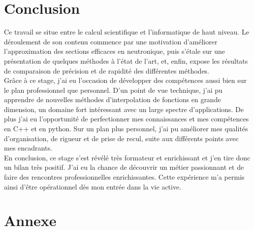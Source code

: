 \newpage
\section{Conclusion}\label{sec:8}
\hspace{0.5cm} Ce travail se situe entre le calcul scientifique et l’informatique de haut niveau. Le déroulement de son contenu commence par une motivation d’améliorer l’approximation des sections efficaces en neutronique, puis s’étale sur une présentation de quelques méthodes à l’état de l’art, et, enfin, expose les résultats de comparaison de précision et de rapidité des différentes méthodes.\\

Grâce à ce stage, j’ai eu l’occasion de développer des compétences aussi bien sur le plan professionnel que personnel. D’un point de vue technique, j’ai pu apprendre de nouvelles méthodes d’interpolation de fonctions en grande dimension, un domaine fort intéressant avec un large spectre d'applications. De plus j’ai eu l’opportunité de perfectionner mes connaissances et mes compétences en C++ et en python. Sur un plan plus personnel, j’ai pu améliorer mes qualités d’organisation, de rigueur et de prise de recul, suite aux différents points avec mes encadrants. \\

En conclusion, ce stage s’est révélé très formateur et enrichissant et j’en tire donc un bilan très positif. J’ai eu la chance de découvrir un métier passionnant et de faire des rencontres professionnelles enrichissantes. Cette expérience m’a permis ainsi d’être opérationnel dès mon entrée dans la vie active.

\newpage
\section*{Annexe}\label{sec:9}

